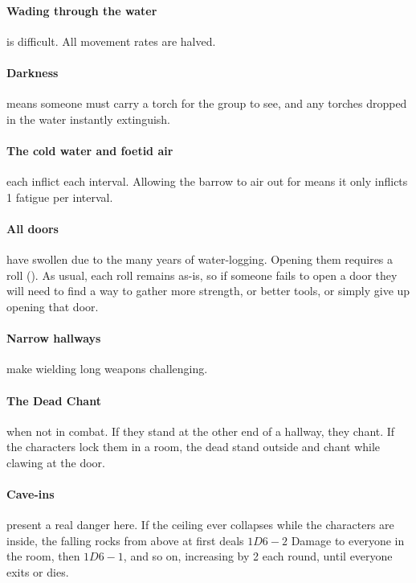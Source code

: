 \paragraph{Wading through the water}
is difficult.
All movement rates are halved.

\paragraph{Darkness}
means someone must carry a torch for the group to see, and any torches dropped in the water instantly extinguish.

\paragraph{The cold water and foetid air}
each inflict  each \gls{interval}.
Allowing the barrow to air out for  means it only inflicts 1 \gls{fatigue} per \gls{interval}.

\paragraph{All doors}
have swollen due to the many years of water-logging.
Opening them requires a  roll (\tn[10]).
As usual, each roll remains as-is, so if someone fails to open a door they will need to find a way to gather more strength, or better tools, or simply give up opening that door.

\paragraph{Narrow hallways}
make wielding long weapons challenging.%

\paragraph{The Dead Chant} when not in combat.
If they stand at the other end of a hallway, they chant.
If the characters lock them in a room, the dead stand outside and chant while clawing at the door.

\paragraph{Cave-ins} present a real danger here.  If the ceiling ever collapses while the characters are inside, the falling rocks from above at first deals $1D6-2$ Damage to everyone in the room, then $1D6-1$, and so on, increasing by 2 each round, until everyone exits or dies.

